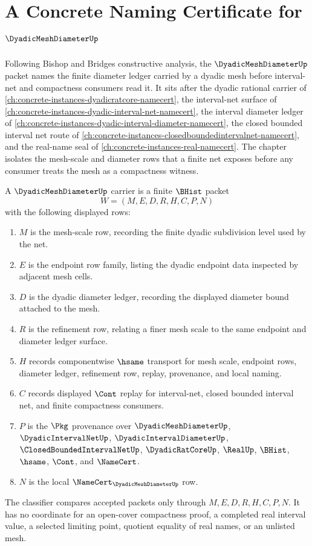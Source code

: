 \chapter{A Concrete Naming Certificate for $\DyadicMeshDiameterUp$}
\label{ch:concrete-instances-dyadic-mesh-diameter-namecert}

Following Bishop and Bridges constructive analysis, the $\DyadicMeshDiameterUp$ packet names the finite diameter ledger carried by a dyadic mesh before interval-net and compactness consumers read it. It sits after the dyadic rational carrier of \autoref{ch:concrete-instances-dyadicratcore-namecert}, the interval-net surface of \autoref{ch:concrete-instances-dyadic-interval-net-namecert}, the interval diameter ledger of \autoref{ch:concrete-instances-dyadic-interval-diameter-namecert}, the closed bounded interval net route of \autoref{ch:concrete-instances-closedboundedintervalnet-namecert}, and the real-name seal of \autoref{ch:concrete-instances-real-namecert}. The chapter isolates the mesh-scale and diameter rows that a finite net exposes before any consumer treats the mesh as a compactness witness.

\begin{definition}
\label{def:dyadic-mesh-diameter-carrier}
A $\DyadicMeshDiameterUp$ carrier is a finite $\BHist$ packet
$$
W=(M,E,D,R,H,C,P,N)
$$
with the following displayed rows:
\begin{enumerate}
\item $M$ is the mesh-scale row, recording the finite dyadic subdivision level used by the net.
\item $E$ is the endpoint row family, listing the dyadic endpoint data inspected by adjacent mesh cells.
\item $D$ is the dyadic diameter ledger, recording the displayed diameter bound attached to the mesh.
\item $R$ is the refinement row, relating a finer mesh scale to the same endpoint and diameter ledger surface.
\item $H$ records componentwise $\hsame$ transport for mesh scale, endpoint rows, diameter ledger, refinement row, replay, provenance, and local naming.
\item $C$ records displayed $\Cont$ replay for interval-net, closed bounded interval net, and finite compactness consumers.
\item $P$ is the $\Pkg$ provenance over $\DyadicMeshDiameterUp$, $\DyadicIntervalNetUp$, $\DyadicIntervalDiameterUp$, $\ClosedBoundedIntervalNetUp$, $\DyadicRatCoreUp$, $\RealUp$, $\BHist$, $\hsame$, $\Cont$, and $\NameCert$.
\item $N$ is the local $\NameCert_{\DyadicMeshDiameterUp}$ row.
\end{enumerate}
The classifier compares accepted packets only through $M,E,D,R,H,C,P,N$. It has no coordinate for an open-cover compactness proof, a completed real interval value, a selected limiting point, quotient equality of real names, or an unlisted mesh.
\end{definition}

